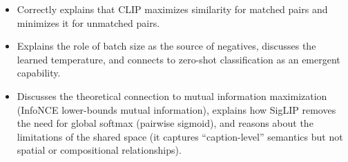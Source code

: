 \begin{interviewq}

\goodgreat
\begin{itemize}
    \item {} Correctly explains that CLIP maximizes similarity for matched pairs and minimizes it for unmatched pairs.
    \item {} Explains the role of batch size as the source of negatives, discusses the learned temperature, and connects to zero-shot classification as an emergent capability.
    \item {} Discusses the theoretical connection to mutual information maximization (InfoNCE lower-bounds mutual information), explains how SigLIP removes the need for global softmax (pairwise sigmoid), and reasons about the limitations of the shared space (it captures ``caption-level'' semantics but not spatial or compositional relationships).
\end{itemize}

\end{interviewq}


